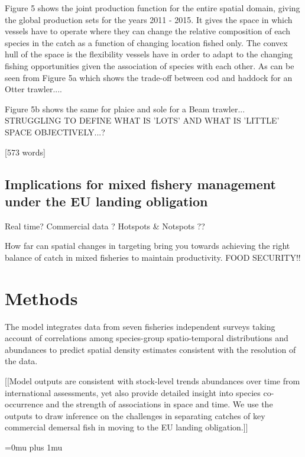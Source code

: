 \documentclass{nature}
\begin{document}
\begin{linenumbers}
Figure 5 shows the joint production function for the entire spatial domain,
giving the global production sets for the years 2011 - 2015. It gives the space
in which vessels have to operate where they can change the relative composition
of each species in the catch as a function of changing location fished only.
The convex hull of the space is the flexibility vessels have in order to adapt
to the changing fishing opportunities given the association of species with
each other\cite{Reimer2017}. As can be seen from Figure 5a which shows the
trade-off between cod and haddock for an Otter trawler....

Figure 5b shows the same for plaice and sole for a Beam trawler...
STRUGGLING TO DEFINE WHAT IS 'LOTS' AND WHAT IS 'LITTLE' SPACE OBJECTIVELY...?

[573 words]

\subsection{Implications for mixed fishery management under the EU landing
	obligation}



Real time?  Commercial data ?  Hotspots \& Notspots ??

How far can spatial changes in targeting bring you towards achieving the right
balance of catch in mixed fisheries to maintain productivity. FOOD SECURITY!!

\section*{Methods}



The model integrates data from seven fisheries independent surveys taking
account of correlations among species-group spatio-temporal distributions and
abundances to predict spatial density estimates consistent with the resolution
of the data. 

[[Model outputs are consistent with stock-level trends abundances over time
from international assessments, yet also provide detailed insight into species
co-occurrence and the strength of associations in space and time.  We use the
outputs to draw inference on the challenges in separating catches of key
commercial demersal fish in moving to the EU landing obligation.]]



\end{linenumbers}
\newpage
\Urlmuskip=0mu plus 1mu\relax

\small{}
\end{document}
